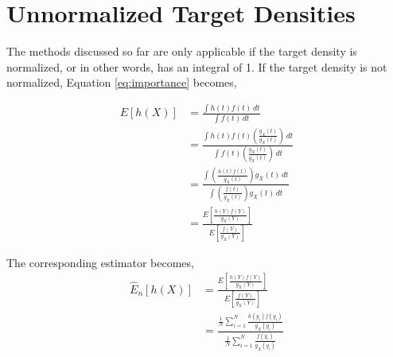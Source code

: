 \section*{Unnormalized Target Densities}
The methods discussed so far are only applicable if the target density is normalized, or in other words, has an integral of 1. If the target density is not normalized, Equation \ref{eq:importance} becomes,

\begin{equation*} \label{eq:unnormalized}
\begin{split}
E[h(X)] & = \frac{\int h(t)f(t)\,dt}{\int f(t)\,dt} \\
& = \frac{\int h(t)f(t) \left ( \frac{g_X(t)}{g_X(t)} \right )\,dt}{{\int f(t)} \left ( \frac{g_X(t)}{g_X(t)} \right )\,dt} \\
& = \frac{\int \left ( \frac{h(t)f(t)}{g_X(t)} \right ) g_X(t)\,dt}{\int \left ( \frac{f(t)}{g_X(t)} \right ) g_X(t)\,dt} \\
& = \frac{E\left [ \frac{h(Y)f(Y)}{g_X(Y)}\right ]}{E\left [ \frac{f(Y)}{g_X(Y)}\right ]}
\end{split}
\end{equation*}

The corresponding estimator becomes,
\begin{equation*}
\begin{split}
\widehat{E}_n[h(X)] & = \frac{E\left [ \frac{h(Y)f(Y)}{g_X(Y)}\right ]}{E\left [ \frac{f(Y)}{g_X(Y)}\right ]} \\
& = \frac{\frac{1}{N}\sum_{i = 1}^{N}\frac{h(y_i)f(y_i)}{g_X(y_i)}}{\frac{1}{N}\sum_{i = 1}^{N}\frac{f(y_i)}{g_X(y_i)}} \\
\end{split}
\end{equation*}
